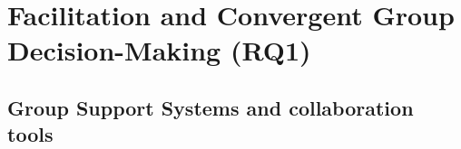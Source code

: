 \section{Facilitation and Convergent Group Decision-Making (RQ1)}
\label{sec:facilitation-and-group-decisions}





\subsection{Group Support Systems and collaboration tools}
\label{sec:gss-collaboration-tools}

